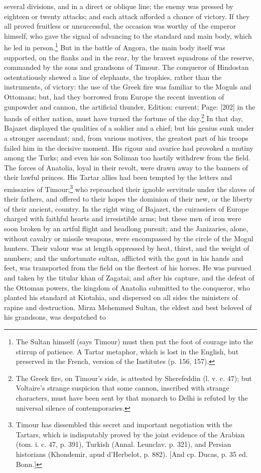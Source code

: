several divisions, and in a direct or oblique line; the enemy was pressed by eighteen or twenty attacks; and each attack afforded a chance of victory. If they all proved fruitless or unsuccessful, the occasion was worthy of the emperor himself, who gave the signal of advancing to the standard and main body, which he led in person.\footnote{The Sultan himself (says Timour) must then put the foot of courage into the stirrup of patience. A Tartar metaphor, which is lost in the English, but preserved in the French, version of the Institutes (p. 156, 157).} But in the battle of Angora, the main body itself was supported, on the flanks and in the rear, by the bravest squadrons of the reserve, commanded by the sons and grandsons of Timour. The conqueror of Hindostan ostentatiously shewed a line of elephants, the trophies, rather than the instruments, of victory: the use of the Greek fire was familiar to the Moguls and Ottomans; but, had they borrowed from Europe the recent invention of gunpowder and cannon, the artificial thunder, Edition: current; Page: [202] in the hands of either nation, must have turned the fortune of the day.\footnote{The Greek fire, on Timour\texthebrew{}’s side, is attested by Sherefeddin (l. v. c. 47); but Voltaire\texthebrew{}’s strange suspicion that some cannon, inscribed with strange characters, must have been sent by that monarch to Delhi is refuted by the universal silence of contemporaries.} In that day, Bajazet displayed the qualities of a soldier and a chief; but his genius sunk under a stronger ascendant; and, from various motives, the greatest part of his troops failed him in the decisive moment. His rigour and avarice had provoked a mutiny among the Turks; and even his son Soliman too hastily withdrew from the field. The forces of Anatolia, loyal in their revolt, were drawn away to the banners of their lawful princes. His Tartar allies had been tempted by the letters and emissaries of Timour;\footnote{Timour has dissembled this secret and important negotiation with the Tartars, which is indisputably proved by the joint evidence of the Arabian (tom. i. c. 47, p. 391), Turkish (Annal. Leunclav. p. 321), and Persian historians (Khondemir, apud d\texthebrew{}’Herbelot, p. 882). [And cp. Ducas, p. 35 ed. Bonn.]} who reproached their ignoble servitude under the slaves of their fathers, and offered to their hopes the dominion of their new, or the liberty of their ancient, country. In the right wing of Bajazet, the cuirassiers of Europe charged with faithful hearts and irresistible arms; but these men of iron were soon broken by an artful flight and headlong pursuit; and the Janizaries, alone, without cavalry or missile weapons, were encompassed by the circle of the Mogul hunters. Their valour was at length oppressed by heat, thirst, and the weight of numbers; and the unfortunate sultan, afflicted with the gout in his hands and feet, was transported from the field on the fleetest of his horses. He was pursued and taken by the titular khan of Zagatai; and after his capture, and the defeat of the Ottoman powers, the kingdom of Anatolia submitted to the conqueror, who planted his standard at Kiotahia, and dispersed on all sides the ministers of rapine and destruction. Mirza Mehemmed Sultan, the eldest and best beloved of his grandsons, was despatched to 